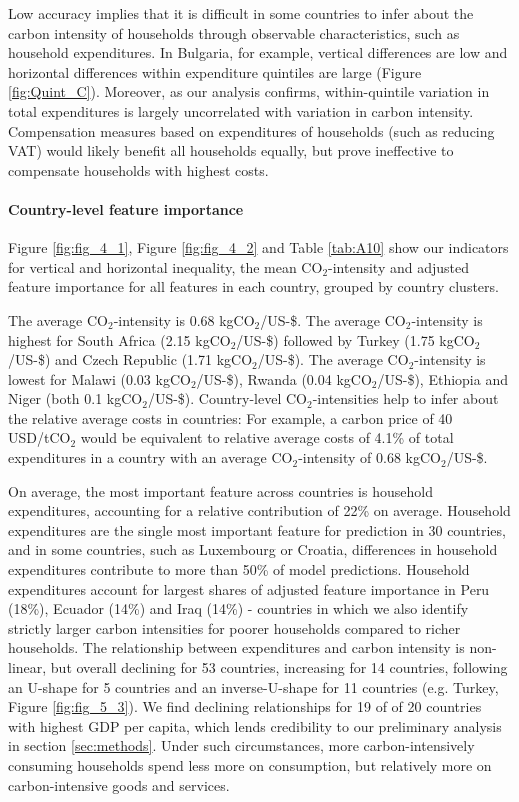 \documentclass[12pt, a4paper]{article}
\begin{document}
Low accuracy implies that it is difficult in some countries to infer about the carbon intensity of households through observable characteristics, such as household expenditures. In Bulgaria, for example, vertical differences are low and horizontal differences within expenditure quintiles are large (Figure \ref{fig:Quint_C}). Moreover, as our analysis confirms, within-quintile variation in total expenditures is largely uncorrelated with variation in carbon intensity. Compensation measures based on expenditures of households (such as reducing VAT) would likely benefit all households equally, but prove ineffective to compensate households with highest costs.

\paragraph{Country-level feature importance}

Figure \ref{fig:fig_4_1}, Figure \ref{fig:fig_4_2} and Table \ref{tab:A10} show our indicators for vertical and horizontal inequality, the mean CO$_{2}$-intensity and adjusted feature importance for all features in each country, grouped by country clusters. %

The average CO$_{2}$-intensity is 0.68 kgCO$_{2}$/US-\$. The average CO$_{2}$-intensity is highest for South Africa (2.15 kgCO$_{2}$/US-\$) followed by Turkey (1.75 kgCO$_{2}$/US-\$) and Czech Republic (1.71 kgCO$_{2}$/US-\$). The average CO$_{2}$-intensity is lowest for Malawi (0.03 kgCO$_{2}$/US-\$), Rwanda (0.04 kgCO$_{2}$/US-\$), Ethiopia and Niger (both 0.1 kgCO$_{2}$/US-\$). Country-level CO$_{2}$-intensities help to infer about the relative average costs in countries: For example, a carbon price of 40 USD/tCO$_{2}$ \autocite{Stiglitz.2017} would be equivalent to relative average costs of 4.1\% of total expenditures in a country with an average CO$_{2}$-intensity of 0.68 kgCO$_{2}$/US-\$.

On average, the most important feature across countries is household expenditures, accounting for a relative contribution of 22\% on average. Household expenditures are the single most important feature for prediction in 30 countries, and in some countries, such as Luxembourg or Croatia, differences in household expenditures contribute to more than 50\% of model predictions. Household expenditures account for largest shares of adjusted feature importance in Peru (18\%), Ecuador (14\%) and Iraq (14\%) - countries in which we also identify strictly larger carbon intensities for poorer households compared to richer households. The relationship between expenditures and carbon intensity is non-linear, but overall declining for 53 countries, increasing for 14 countries, following an U-shape for 5 countries and an inverse-U-shape for 11 countries (e.g. Turkey, Figure \ref{fig:fig_5_3}). We find declining relationships for 19 of of 20 countries with highest GDP per capita, which lends credibility to our preliminary analysis in section \ref{sec:methods}. Under such circumstances, more carbon-intensively consuming households spend less more on consumption, but relatively more on carbon-intensive goods and services.
\end{document}
